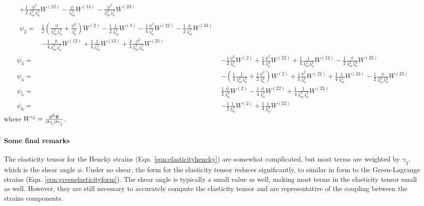 \begin{subequations}
\begin{align}
\begin{split}
        +\frac{1}{2}\frac{\phi^2}{\lambda_m^2\lambda_n^2}W^{(12)}
        -\frac{\phi}{\lambda_m^4}W^{(13)}
        -\frac{\phi^3}{\lambda_m^2 \lambda_n^2}W^{(23)}
\end{split}	\\
\begin{split}
\psi_2 =&
        \frac{1}{2}\left(\frac{\phi}{\lambda_m^2\lambda_n^2} + \frac{\phi^3}{\lambda_n^4}\right)W^{(2)}
        -\frac{1}{2}\frac{1}{\lambda_m^4}W^{(3)}
        -\frac{1}{4}\frac{\phi^3}{\lambda_n^4}W^{(22)}
        -\frac{1}{2}\frac{\phi}{\lambda_m^4}W^{(33)}    \\
        &-\frac{1}{4}\frac{\phi}{\lambda_m^2 \lambda_n^2}W^{(12)}
        +\frac{1}{4}\frac{1}{\lambda_m^4}W^{(13)}
        +\frac{3}{4}\frac{\phi^2}{\lambda_m^2 \lambda_n^2}W^{(23)}
\end{split}	\\
\psi_3 =&
        -\frac{1}{2}\frac{\phi^2}{\lambda_n^4}W^{(2)}
        +\frac{1}{4}\frac{\phi^2}{\lambda_n^4}W^{(22)}
        +\frac{1}{4}\frac{1}{\lambda_m^2 \lambda_n^2}W^{(12)}
        -\frac{1}{2}\frac{\phi}{\lambda_m^2 \lambda_n^2}W^{(23)}	\\
\psi_4 =&
        -\left(\frac{1}{4}\frac{1}{\lambda_m^2\lambda_n^2}+\frac{1}{2}\frac{\phi^2}{\lambda_n^4}\right)W^{(2)}
        +\frac{1}{4}\frac{\phi^2}{\lambda_n^4}W^{(22)}
        +\frac{1}{4}\frac{1}{\lambda_m^4}W^{(33)}
        -\frac{1}{2}\frac{\phi}{\lambda_m^2 \lambda_n^2}W^{(23)}	\\
\psi_5 =&
        \frac{1}{2}\frac{\phi}{\lambda_n^4}W^{(2)}
        -\frac{1}{4}\frac{\phi}{\lambda_n^4}W^{(22)}
        +\frac{1}{4}\frac{1}{\lambda_m^2 \lambda_n^2}W^{(23)}	\\
\psi_6 =&
        -\frac{1}{2}\frac{1}{\lambda_n^4}W^{(2)}
        +\frac{1}{4}\frac{1}{\lambda_n^4}W^{(22)}
\end{align}
\end{subequations}
where $W^{ij} = \md{\Psi}{2}{\gamma_i}{}{\gamma_j}{}$.

\paragraph{Some final remarks} 
	The elasticity tensor for the Hencky strains (Eqn. \ref{eqn:elasticityhencky}) are somewhat complicated, but most terms are weighted by $\gamma_3$, which is the shear angle $\phi$. Under no shear, the form for the elasticity tensor reduces significantly, to similar in form to the Green-Lagrange strains (Eqn. \ref{eqn:greenelasticityform}). The shear angle is typically a small value as well, making most terms in the elasticity tensor small as well. However, they are still necessary to accurately compute the elasticity tensor and are representative of the coupling between the strains components. 
    
